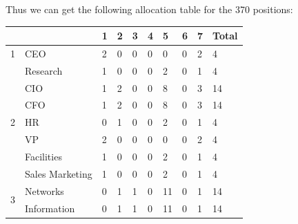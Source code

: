 \documentclass[tcn = 37075, sheet = false, abstract = false]{mcmthesis}
\begin{document}
	Thus we can get the following allocation table for the 370 positions:
	\begin{table}[htb!]
		\centering
		\begin{tabular}{l|l|lllllll|l}   \hline
			\backslashbox{Tier}{}& \backslashbox{Position}{level}&1&2&3&4&5&6&7&Total\\ \hline
			1                  & CEO              & 2              & 0              & 0                      & 0                        & 0                    & 0                      & 2                    & 4     \\\hline
			\multirow{7}{2pt}{2} & Research           & 1              & 0              & 0                      & 0                        & 2                    & 0                      & 1                    & 4     \\
			& CIO                & 1              & 2              & 0                      & 0                        & 8                    & 0                      & 3                    & 14    \\
			& CFO                & 1              & 2              & 0                      & 0                        & 8                    & 0                      & 3                    & 14    \\
			& HR                 & 0              & 1              & 0                      & 0                        & 2                    & 0                      & 1                    & 4     \\
			& VP                 & 2              & 0              & 0                      & 0                        & 0                    & 0                      & 2                    & 4     \\
			& Facilities         & 1              & 0              & 0                      & 0                        & 2                    & 0                      & 1                    & 4     \\
			& Sales Marketing    & 1              & 0              & 0                      & 0                        & 2                    & 0                      & 1                    & 4     \\\hline
			\multirow{9}{2pt}{3} & Networks           & 0              & 1              & 1                      & 0                        & 11                   & 0                      & 1                    & 14    \\
			& Information        & 0              & 1              & 1                      & 0                        & 11                   & 0                      & 1                    & 14    \\

\end{tabular}
\end{table}
\end{document}
